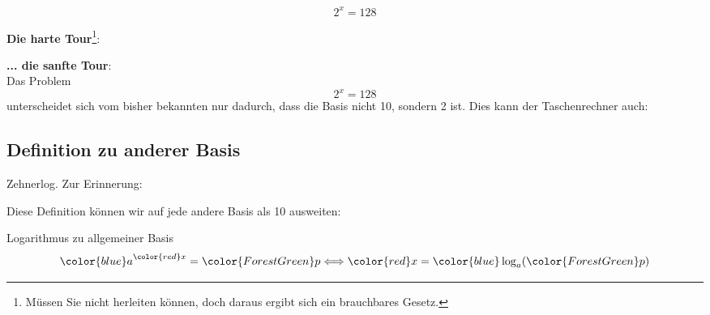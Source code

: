 $$2^x = 128$$

\textbf{Die harte Tour}\label{harteTourLogarithmen}\footnote{Müssen Sie nicht herleiten können,
  doch daraus ergibt sich ein brauchbares Gesetz.}:\\


  \textbf{... die sanfte Tour}:\\

 Das Problem $$2^x=128$$ unterscheidet sich vom bisher bekannten nur
 dadurch, dass die Basis nicht 10, sondern 2 ist. Dies kann der
 Taschenrechner auch: 



\subsection{Definition zu anderer Basis}
 
\begin{bemerkung}{Zehnerlog.}{}
  Zur Erinnerung:
  \noTRAINER{\vspace{22mm}}
    
\end{bemerkung}

Diese Definition können wir auf jede andere Basis als 10 ausweiten:

 \begin{definition}{Logarithmus zu allgemeiner Basis}{}
   $${\color{blue}a}^{\color{red}x}={\color{ForestGreen}p} \Longleftrightarrow {\color{red}x} = {\color{blue} \log_a}({\color{ForestGreen}p})$$
   \end{definition}


